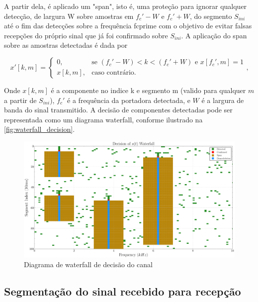 A partir dela, é aplicado um "span", isto é, uma proteção para ignorar qualquer detecção, de largura \gls{W} sobre amostras em $f_c' - W$ e $f_c' + W$, do segmento $S_{ini}$ até o fim das detecções sobre a frequência \gls{fcprime} com o objetivo de evitar falsas recepções do próprio sinal que já foi confirmado sobre $S_{ini}$. A aplicação do span sobre as amostras detectadas é dada por

\begin{equation}
	x'[k,m] =
	\begin{cases}
		0, & \text{se } (f_c' - W) < k < (f_c' + W)
		\text{ e } x[f_c',m] = 1 \\[8pt]
		x[k,m], & \text{caso contrário.}
	\end{cases} \text{,}
\end{equation}


\noindent Onde $x[k,m]$ é a componente no indice \gls{k} e segmento \gls{m} (valido para qualquer $m$ a partir de $S_{ini}$), $f_c'$ é a frequência da portadora detectada, e $W$ é a largura de banda do sinal transmitido. A decisão de componentes detectadas pode ser representada como um diagrama waterfall, conforme ilustrado na \autoref{fig:waterfall_decision}.

\begin{figure}[H]
	\centering
	\caption{Diagrama de waterfall de decisão do canal}\label{fig:waterfall_decision}
	\includegraphics[width=\linewidth]{assets/cap3/example_detector_waterfall_decision.pdf}
\end{figure}

\subsection{Segmentação do sinal recebido para recepção}\label{sec:segmentacao_recepcao}

